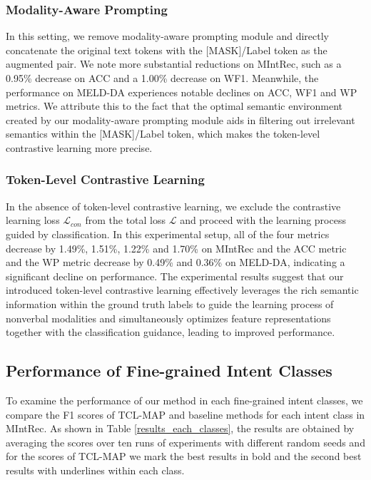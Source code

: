 \documentclass[letterpaper]{article} %
\begin{document}
\subsubsection{Modality-Aware Prompting}
In this setting, we remove modality-aware prompting module and directly concatenate the original text tokens with the [MASK]/Label token as the augmented pair. We note more substantial reductions on MIntRec, such as a 0.95\% decrease on ACC and a 1.00\% decrease on WF1. Meanwhile, the performance on MELD-DA experiences notable declines on ACC, WF1 and WP metrics. We attribute this to the fact that the optimal semantic environment created by our modality-aware prompting module aids in filtering out irrelevant semantics within the [MASK]/Label token, which makes the token-level contrastive learning more precise.


\subsubsection{Token-Level Contrastive Learning}
In the absence of token-level contrastive learning, we exclude the contrastive learning loss $\mathcal{L}_{con}$ from the total loss $\mathcal{L}$ and proceed with the learning process guided by classification. In this experimental setup, all of the four metrics decrease by 1.49\%, 1.51\%, 1.22\% and 1.70\% on MIntRec and the ACC metric and the WP metric decrease by 0.49\% and 0.36\% on MELD-DA, indicating a significant decline on performance. The experimental results suggest that our introduced token-level contrastive learning effectively leverages the rich semantic information within the ground truth labels to guide the learning process of nonverbal modalities and simultaneously optimizes feature representations together with the classification guidance, leading to improved performance.

\subsection{Performance of Fine-grained Intent Classes}
To examine the performance of our method in each fine-grained intent classes, we compare the F1 scores of TCL-MAP and baseline methods for each intent class in MIntRec. As shown in Table \ref{results_each_classes}, the results are obtained by averaging the scores over ten runs of experiments with different random seeds and for the scores of TCL-MAP we mark the best results in bold and the second best results with underlines within each class.
\end{document}
